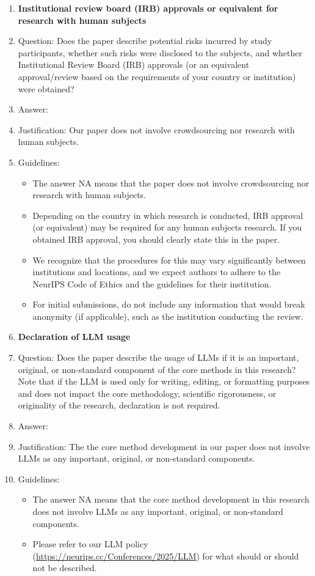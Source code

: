 \documentclass{article}
\theoremstyle{remark}
\begin{document}
\begin{enumerate}
\item {\bf Institutional review board (IRB) approvals or equivalent for research with human subjects}
    \item[] Question: Does the paper describe potential risks incurred by study participants, whether such risks were disclosed to the subjects, and whether Institutional Review Board (IRB) approvals (or an equivalent approval/review based on the requirements of your country or institution) were obtained?
    \item[] Answer: \answerNA{} %
    \item[] Justification: Our paper does not involve crowdsourcing nor research with human subjects.
    \item[] Guidelines:
    \begin{itemize}
        \item The answer NA means that the paper does not involve crowdsourcing nor research with human subjects.
        \item Depending on the country in which research is conducted, IRB approval (or equivalent) may be required for any human subjects research. If you obtained IRB approval, you should clearly state this in the paper. 
        \item We recognize that the procedures for this may vary significantly between institutions and locations, and we expect authors to adhere to the NeurIPS Code of Ethics and the guidelines for their institution. 
        \item For initial submissions, do not include any information that would break anonymity (if applicable), such as the institution conducting the review.
    \end{itemize}

\item {\bf Declaration of LLM usage}
    \item[] Question: Does the paper describe the usage of LLMs if it is an important, original, or non-standard component of the core methods in this research? Note that if the LLM is used only for writing, editing, or formatting purposes and does not impact the core methodology, scientific rigorousness, or originality of the research, declaration is not required.
    \item[] Answer: \answerNA{} %
    \item[] Justification: The the core method development in our paper does not involve LLMs as any important, original, or non-standard components.
    \item[] Guidelines:
    \begin{itemize}
        \item The answer NA means that the core method development in this research does not involve LLMs as any important, original, or non-standard components.
        \item Please refer to our LLM policy (\url{https://neurips.cc/Conferences/2025/LLM}) for what should or should not be described.
    \end{itemize}

\end{enumerate}
\end{document}
